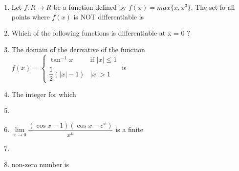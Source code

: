\documentclass[journal,12pt,twocolumn]{IEEEtran}
\begin{document}
\begin{enumerate}
\item Let $f:R\to R$ be a function defined by $f(x)=max\{x,x^3\}$. The set fo all points where $f(x)$ is NOT differentiable is
\begin{itemize}
\end{itemize}

\item Which of the following functions is differentiable at x = 0 ?
\begin{itemize}
\end{itemize}

\item The domain of the derivative of the function $f(x)\mathbin{=}\begin{cases} \tan^{-1}x & \text{if $|x|\leq 1$}\\\dfrac{1}{2}(|x|-1) & \text{$|x|>1$}\end{cases}$ is
\begin{itemize}
\end{itemize}

\item The integer for which \item[~]\item[~]$\lim\limits_{x \to 0}\dfrac{(\cos x-1)(\cos x-e^x)}{x^n}$ is a finite \item[~]\item[~]non-zero number is
\begin{itemize}
\end{itemize}


\end{enumerate}
\end{document}
